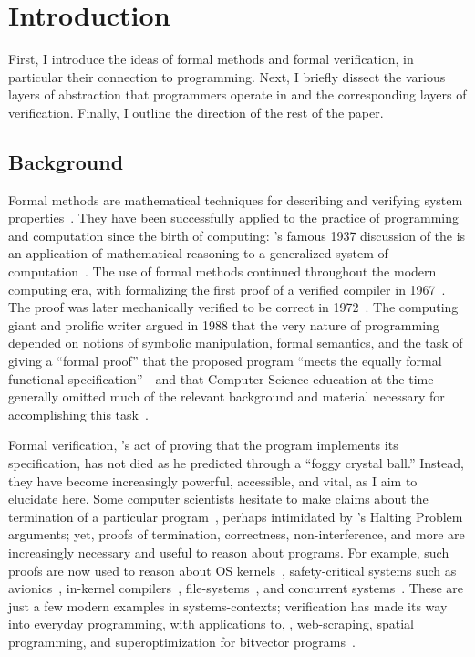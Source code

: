 \section{Introduction}

First, I introduce the ideas of formal methods and formal verification, in
particular their connection to programming. Next, I briefly dissect the various
layers of abstraction that programmers operate in and the corresponding
layers of verification. Finally, I outline the direction of the rest of the
paper.

\subsection{Background}

Formal methods are mathematical techniques for describing and verifying system
properties~\cite{Wing_90}. They have been successfully applied to the practice
of programming and computation since the birth of computing:
\citeauthor{Turing_1937}'s famous 1937 discussion of the {\haltprob} is an
application of mathematical reasoning to a generalized system of
computation~\cite{Turing_1937}. The use of formal methods continued throughout
the modern computing era, with \citeauthor{McCarthy_67} formalizing the first
proof of a verified compiler in 1967~\cite{McCarthy_67}. The proof was later
mechanically verified to be correct in 1972~\cite{Milner_72}. The computing
giant and prolific writer \citeauthor{EWD:EWD1036} argued in 1988 that the very
nature of programming depended on notions of symbolic manipulation, formal
semantics, and the task of giving a ``formal proof'' that the proposed program
``meets the equally formal functional specification''---and that Computer
Science education at the time generally omitted much of the relevant background
and material necessary for accomplishing this task~\cite{EWD:EWD1036}.

Formal verification, \citeauthor{EWD:EWD1036}'s act of proving that the program
implements its specification, has not died as he predicted through a ``foggy
crystal ball.'' Instead, they have become increasingly powerful, accessible, and
vital, as I aim to elucidate here. Some computer scientists hesitate to make
claims about the termination of a particular program~\cite{Cook_2011}, perhaps
intimidated by \citeauthor{Turing_1937}'s Halting Problem arguments; yet, proofs
of termination, correctness, non-interference, and more are increasingly
necessary and useful to reason about programs. For example, such proofs are now
used to reason about OS
kernels~\cite{Klein_EHACDEEKNSTW_09,Klein_AEHCDEEKNSTW_10,Klein_AEMSKH_14,Sewell_KH_16,Narayanan_2019,Narayan_2020,Nelson_2017},
safety-critical systems such as avionics~\cite[\S 1]{Leroy-Compcert-CACM},
in-kernel compilers~\cite{186144,258848}, file-systems~\cite{Zou_2019}, and
concurrent systems~\cite{222565,222621}. These are just a few modern examples in
systems-contexts; verification has made its way into everyday programming, with
applications to, \eg, web-scraping, spatial programming, and superoptimization
for bitvector programs~\cite[\S 4]{Torlak_2013}.

